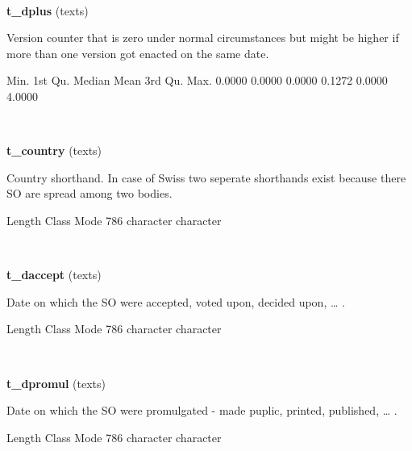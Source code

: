 \documentclass[]{article}
\newenvironment{Shaded}{\begin{snugshade}}{\end{snugshade}}
\newcommand{\DecValTok}[1]{\textcolor[rgb]{0.00,0.00,0.81}{{#1}}}
\newcommand{\FloatTok}[1]{\textcolor[rgb]{0.00,0.00,0.81}{{#1}}}
\newcommand{\NormalTok}[1]{{#1}}
\begin{document}
~

\vspace{1em}

\textbf{t\_dplus} (texts)

Version counter that is zero under normal circumstances but might be
higher if more than one version got enacted on the same date.

\begin{Shaded}
\begin{Highlighting}[]
   \NormalTok{Min. 1st Qu.  Median    Mean 3rd Qu.    Max. }
 \FloatTok{0.0000}  \FloatTok{0.0000}  \FloatTok{0.0000}  \FloatTok{0.1272}  \FloatTok{0.0000}  \FloatTok{4.0000} 
\end{Highlighting}
\end{Shaded}

~

\vspace{1em}

\textbf{t\_country} (texts)

Country shorthand. In case of Swiss two seperate shorthands exist
because there SO are spread among two bodies.

\begin{Shaded}
\begin{Highlighting}[]
   \NormalTok{Length     Class      Mode }
      \DecValTok{786} \NormalTok{character character }
\end{Highlighting}
\end{Shaded}

~

\vspace{1em}

\textbf{t\_daccept} (texts)

Date on which the SO were accepted, voted upon, decided upon, \ldots{} .

\begin{Shaded}
\begin{Highlighting}[]
   \NormalTok{Length     Class      Mode }
      \DecValTok{786} \NormalTok{character character }
\end{Highlighting}
\end{Shaded}

~

\vspace{1em}

\textbf{t\_dpromul} (texts)

Date on which the SO were promulgated - made puplic, printed, published,
\ldots{} .

\begin{Shaded}
\begin{Highlighting}[]
   \NormalTok{Length     Class      Mode }
      \DecValTok{786} \NormalTok{character character }
\end{Highlighting}
\end{Shaded}
\end{document}
